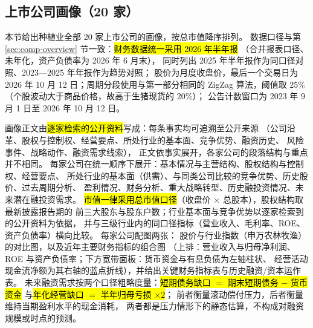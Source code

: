 \subsection{上市公司画像（\num{20} 家）}
\label{sec:co-planting}

本节给出种植业全部 \num{20} 家上市公司的画像，按总市值降序排列。
数据口径与第 \ref{sec:comp-overview} 节一致：\hl{财务数据统一采用 2026 年半年报}
（合并报表口径、未年化，资产负债率为 2026 年 6 月末），
同时列出 2025 年半年报作为同口径对照、2023---2025 年年报作为趋势对照；
股价为月度收盘价，最后一个交易日为 2026 年 10 月 12 日；周期分段使用与第一部分相同的
ZigZag 算法，阈值取 25\%（个股波动大于商品价格，故高于生猪现货的 20\%）；
公告计数窗口为 2023 年 9 月 1 日至 2026 年 10 月 12 日。

画像正文由\hl{逐家检索的公开资料}写成：每条事实均可追溯至公开来源
（公司沿革、股权与控制权、经营要点、所处行业的基本面、竞争优势、融资历史、
风险事件、战略动作、融资需求线索），
正文依事实展开，各家公司的段落结构与重点并不相同。
每家公司在统一顺序下展开：基本情况与主营结构、股权结构与控制权、经营要点、
所处行业的基本面（供需）、与同类公司比较的竞争优势、历史股价、过去周期分析、
盈利情况、财务分析、重大战略转型、历史融投资情况、未来潜在融投资需求。
\hl{市值一律采用总市值口径}（收盘价 $\times$ 总股本），股权结构取最新披露报告期的
前三大股东与股东户数；行业基本面与竞争优势以逐家检索到的公开资料为依据，
并与三级行业内的同口径指标（营业收入、毛利率、ROE、资产负债率）横向比较。
每家公司配图两张：
股价与行业指数（申万农林牧渔）的对比图，以及近年主要财务指标的组合图
（上排：营业收入与归母净利润、ROE 与资产负债率；下方宽带面板：货币资金与有息负债为左轴柱状、
经营活动现金流净额为其右轴的蓝点折线），并给出关键财务指标表与历史融资/资本运作表。
未来融资需求按两个口径粗略度量：\hl{短期债务缺口 $=$ 期末短期债务 $-$ 货币资金}
与\hl{年化经营缺口 $=$ 半年归母亏损 $\times 2$}；
前者衡量滚动偿付压力，后者衡量维持当期盈利水平的现金消耗，
两者都是压力情形下的静态估算，不构成对融资规模或时点的预测。


